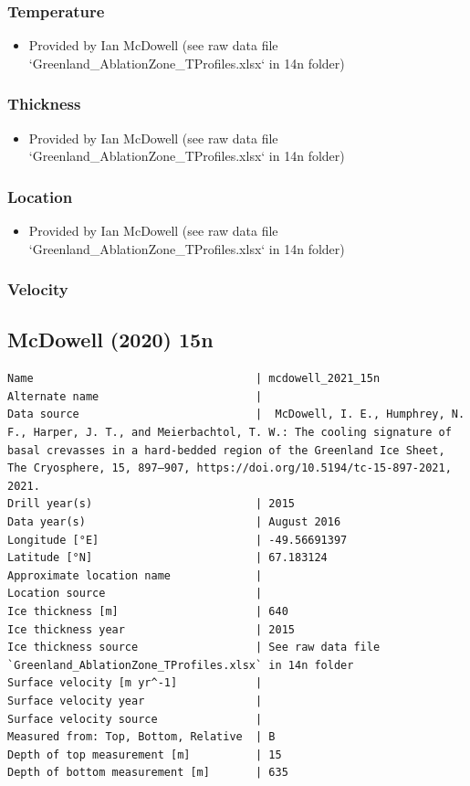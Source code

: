 \documentclass[article,a4paper,times,11pt,twoside]{article}
\begin{document}
\subsubsection{Temperature}
\label{sec:org26b1d29}

\begin{itemize}
\item Provided by Ian McDowell (see raw data file `Greenland\_AblationZone\_TProfiles.xlsx` in 14n folder)
\end{itemize}

\subsubsection{Thickness}
\label{sec:orgbb41df2}

\begin{itemize}
\item Provided by Ian McDowell (see raw data file `Greenland\_AblationZone\_TProfiles.xlsx` in 14n folder)
\end{itemize}

\subsubsection{Location}
\label{sec:orgdba2f02}

\begin{itemize}
\item Provided by Ian McDowell (see raw data file `Greenland\_AblationZone\_TProfiles.xlsx` in 14n folder)
\end{itemize}

\subsubsection{Velocity}
\label{sec:org293848e}
\clearpage
\subsection{McDowell (2020) 15n}
\label{sec:orge9ac972}
\begin{verbatim}
Name                                  | mcdowell_2021_15n
Alternate name                        | 
Data source                           |  McDowell, I. E., Humphrey, N. F., Harper, J. T., and Meierbachtol, T. W.: The cooling signature of basal crevasses in a hard-bedded region of the Greenland Ice Sheet, The Cryosphere, 15, 897–907, https://doi.org/10.5194/tc-15-897-2021, 2021.
Drill year(s)                         | 2015
Data year(s)                          | August 2016
Longitude [°E]                        | -49.56691397
Latitude [°N]                         | 67.183124
Approximate location name             | 
Location source                       | 
Ice thickness [m]                     | 640
Ice thickness year                    | 2015
Ice thickness source                  | See raw data file `Greenland_AblationZone_TProfiles.xlsx` in 14n folder
Surface velocity [m yr^-1]            | 
Surface velocity year                 | 
Surface velocity source               | 
Measured from: Top, Bottom, Relative  | B
Depth of top measurement [m]          | 15
Depth of bottom measurement [m]       | 635
\end{verbatim}
\end{document}
